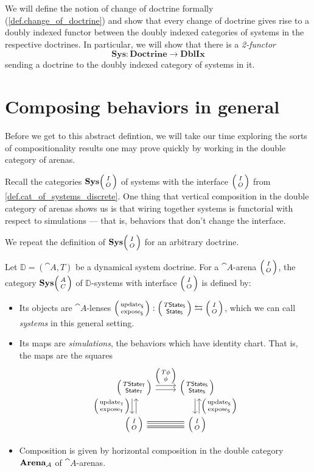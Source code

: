 \documentclass[DynamicalBook]{subfiles}
\begin{document}
We will define the notion of change of doctrine formally
(\cref{def.change_of_doctrine}) and show that every change of doctrine gives
rise to a doubly indexed functor between the doubly indexed categories of
systems in the respective doctrines. In particular, we will show that there is a
\emph{2-functor} 
$$\textbf{Sys} : \textbf{Doctrine} \to \textbf{DblIx}$$
sending a doctrine to the doubly indexed category of systems in it. 



\section{Composing behaviors in general}\label{sec.behaviors_general}

Before we get to this abstract defintion, we will take our time exploring the
sorts of compositionality results one may prove quickly by working in the double
category of arenas.

Recall the categories $\Cat{Sys}\lens{I}{O}$ of systems with the interface
$\lens{I}{O}$ from
\cref{def.cat_of_systems_discrete}. One thing that vertical composition in the
double category of arenas shows us is that wiring together systems is functorial
with respect to simulations --- that is, behaviors that don't change the
interface.

We repeat the definition of $\Cat{Sys}\lens{I}{O}$ for an arbitrary doctrine.
  \begin{definition}\label{def.cat_of_systems}
  Let $\mathbb{D} = (\cat{A}, T)$ be a dynamical system doctrine. For a
    $\cat{A}$-arena $\lens{I}{O}$, the category $\Cat{Sys}\lens{A}{C}$ of
    $\mathbb{D}$-systems with interface $\lens{I}{O}$ is defined by:
\begin{itemize}
  \item Its objects are $\cat{A}$-lenses $\lens{\update{S}}{\expose{S}} :
    \lens{T\State{S}}{\State{S}} \fromto \lens{I}{O}$, which we can call
    \emph{systems} in this general setting.
  \item Its maps are \emph{simulations}, the behaviors which have identity
    chart. That is, the maps are the squares 
\[
    \begin{tikzcd}
      \lens{T\State{T}}{\State{T}} \ar[r, shift left, "\lens{T\phi}{\phi}"] \ar[r, shift right] \ar[d, shift right,
      "\lens{\update{T}}{\expose{T}}"'] \ar[d, shift left, leftarrow] &
      \lens{T\State{S}}{\State{S}} \ar[d, shift left, leftarrow,
      "\lens{\update{S}}{\expose{S}}"] \ar[d, shift right]\\
      \lens{I}{O} \ar[r, shift right, equals] \ar[r,
      shift left, equals] & \lens{I}{O}
    \end{tikzcd}
\]
\item Composition is given by horizontal composition in the double category
  $\textbf{Arena}_{\mathcal{A}}$ of $\cat{A}$-arenas.
\end{itemize}
  \end{definition}
\end{document}
